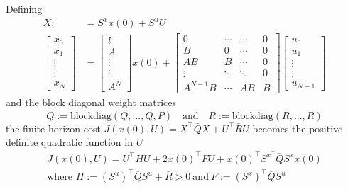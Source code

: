 \newpar{}

Defining
\noindent\begin{align*}
    X:                        & =S^x x(0)+S^u U \\
    \left.\left[
    \begin{array}
            {c}x_0 \\
            x_1    \\
            \vdots \\
            \vdots \\
            x_N
        \end{array}\right.\right] & =
    \begin{bmatrix}
        l      \\
        A      \\
        \vdots \\
        \vdots \\
        A^N
    \end{bmatrix}x(0)+
    \begin{bmatrix}
        0        & \cdots & \cdots & 0 \\
        B        & 0      & \cdots & 0 \\
        AB       & B      & \cdots & 0 \\
        \vdots   & \ddots & \ddots & 0 \\
        A^{N-1}B & \cdots & AB     & B
    \end{bmatrix}
    \begin{bmatrix}
        u_0    \\
        u_1    \\
        \vdots \\
        \vdots \\
        u_{N-1}
    \end{bmatrix}
\end{align*}
and the block diagonal weight matrices
\noindent\begin{equation*}
    \overline{Q}:=\mathrm{blockdiag}(Q,...,Q,P)\quad\mathrm{and}\quad\overline{R}:=\mathrm{blockdiag}(R,...,R)
\end{equation*}
the finite horizon cost $J(x(0), U) = X^{\top}\bar{Q}X + U^{\top}\bar{R}U$ becomes the positive definite quadratic function in $U$
\noindent\begin{gather*}
    J(x(0), U) =U^{\top}HU+2{x(0)}^{\top}FU+{x(0)}^{\top}S^{x^{\top}}\overline{Q}S^{x}x(0)\\
    \text{where } H:={(S^u)}^\top\overline{Q} S^u+\overline{R} > 0 \mathrm{~and~}F:={(S^x)}^\top\overline{Q} S^u
\end{gather*}


